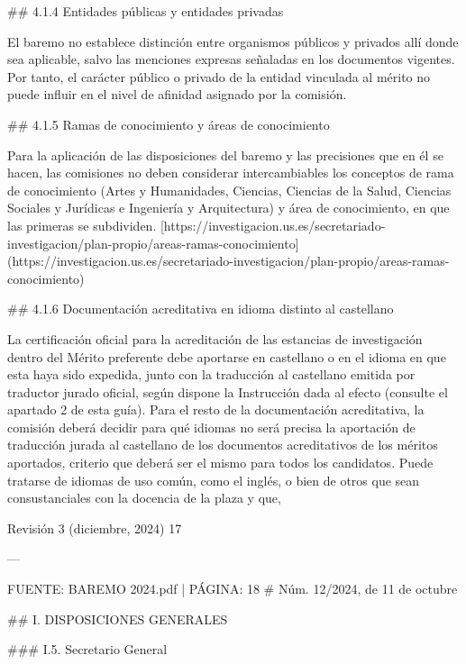 \documentclass{article}
\begin{document}
\begin{itemize}
\begin{itemize}
\begin{scriptsize}
                  \#\# 4.1.4 Entidades públicas y entidades privadas

                  El baremo no establece distinción entre organismos públicos y privados allí donde sea aplicable, salvo las menciones expresas señaladas en los documentos vigentes. Por tanto, el carácter público o privado de la entidad vinculada al mérito no puede influir en el nivel de afinidad asignado por la comisión.

                  \#\# 4.1.5 Ramas de conocimiento y áreas de conocimiento

                  Para la aplicación de las disposiciones del baremo y las precisiones que en él se hacen, las comisiones no deben considerar intercambiables los conceptos de rama de conocimiento (Artes y Humanidades, Ciencias, Ciencias de la Salud, Ciencias Sociales y Jurídicas e Ingeniería y Arquitectura) y área de conocimiento, en que las primeras se subdividen.
                    [https://investigacion.us.es/secretariado-investigacion/plan-propio/areas-ramas-conocimiento](https://investigacion.us.es/secretariado-investigacion/plan-propio/areas-ramas-conocimiento)

                  \#\# 4.1.6 Documentación acreditativa en idioma distinto al castellano

                  La certificación oficial para la acreditación de las estancias de investigación dentro del Mérito preferente debe aportarse en castellano o en el idioma en que esta haya sido expedida, junto con la traducción al castellano emitida por traductor jurado oficial, según dispone la Instrucción dada al efecto (consulte el apartado 2 de esta guía). Para el resto de la documentación acreditativa, la comisión deberá decidir para qué idiomas no será precisa la aportación de traducción jurada al castellano de los documentos acreditativos de los méritos aportados, criterio que deberá ser el mismo para todos los candidatos. Puede tratarse de idiomas de uso común, como el inglés, o bien de otros que sean consustanciales con la docencia de la plaza y que,

                  Revisión 3 (diciembre, 2024) 17

                  ---

                  FUENTE: BAREMO 2024.pdf | PÁGINA: 18
                  \# Núm. 12/2024, de 11 de octubre

                  \#\# I. DISPOSICIONES GENERALES

                  \#\#\# I.5. Secretario General


\end{scriptsize}
\end{itemize}
\end{itemize}
\end{document}
